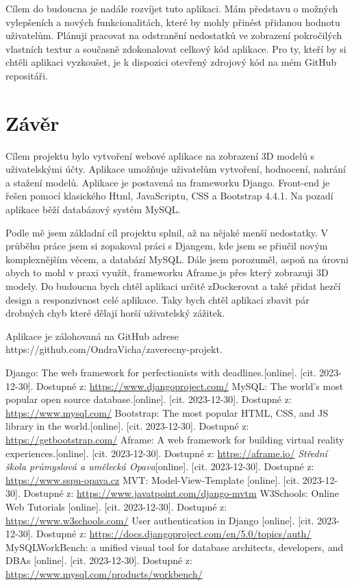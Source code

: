 \documentclass[12pt, a4paper,
oneside,      %
openright
]{report}
\begin{document}
Cílem do budoucna je nadále rozvíjet tuto aplikaci. Mám představu o možných vylepšeních a nových funkcionalitách, které by mohly přinést přidanou hodnotu uživatelům. Plánuji pracovat na odstranění nedostatků ve zobrazení pokročilých vlastních textur a současně zdokonalovat celkový kód aplikace. Pro ty, kteří by si chtěli aplikaci vyzkoušet, je k dispozici otevřený zdrojový kód na mém GitHub repositáři.
	\chapter*{Závěr}
	
	Cílem projektu bylo vytvoření webové aplikace na zobrazení 3D modelů s uživatelskými účty. Aplikace umožňuje uživatelům vytvoření, hodnocení, nahrání a stažení modelů. Aplikace je postavená na frameworku Django. Front-end je řešen pomocí klasického Html, JavaScriptu, CSS a Bootstrap 4.4.1. Na pozadí aplikace běží databázový systém MySQL. 
	
	Podle mě jsem základní cíl projektu splnil, až na nějaké menší nedostatky. V průběhu práce jsem si zopakoval práci s Djangem, kde jsem se přiučil novým komplexnějším věcem, a databází MySQL. Dále jsem porozuměl, aspoň na úrovni abych to mohl v praxi využít, frameworku Aframe.js přes který zobrazuji 3D modely. Do budoucna bych chtěl aplikaci určitě zDockerovat a také přidat hezčí design a responzivnost celé aplikace. Taky bych chtěl aplikaci zbavit pár drobných chyb které dělají horší uživatelský zážitek.
	
	Aplikace je zálohovaná na GitHub adrese https://github.com/OndraVicha/zaverecny-projekt.
	\renewcommand{\bibname}{Seznam použitých informačních zdrojů}
	\begin{thebibliography}{99}
		Django: The web framework for perfectionists with deadlines.[online]. [cit. 2023-12-30]. Dostupné z: \url{https://www.djangoproject.com/}
		MySQL:  The world's most popular open source database.[online]. [cit. 2023-12-30]. Dostupné z: \url{https://www.mysql.com/}
		Bootstrap: The most popular HTML, CSS, and JS library in the world.[online]. [cit. 2023-12-30]. Dostupné z: \url{https://getbootstrap.com/}
		Aframe: A web framework for building virtual reality experiences.[online]. [cit. 2023-12-30]. Dostupné z:  \url{https://aframe.io/}
		 \textit{Střední škola průmyslová a umělecká Opava}[online]. [cit. 2023-12-30]. Dostupné z:  \url{https://www.sspu-opava.cz}
		MVT: Model-View-Template  [online]. [cit. 2023-12-30]. Dostupné z: \url{https://www.javatpoint.com/django-mvtm}
		W3Schools: Online Web Tutorials [online]. [cit. 2023-12-30]. Dostupné z: \url{https://www.w3schools.com/}
		User authentication in Django [online]. [cit. 2023-12-30]. Dostupné z: \url{https://docs.djangoproject.com/en/5.0/topics/auth/}
		MySQLWorkBench: a unified visual tool for database architects, developers, and DBAs [online]. [cit. 2023-12-30]. Dostupné z: \url{https://www.mysql.com/products/workbench/}

	\end{thebibliography}
	\newpage
	\listoffigures
	
\end{document}
